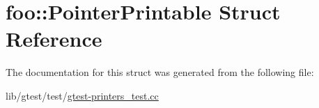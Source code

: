 \hypertarget{structfoo_1_1_pointer_printable}{\section{foo\-:\-:Pointer\-Printable Struct Reference}
\label{structfoo_1_1_pointer_printable}
}


The documentation for this struct was generated from the following file\-:\begin{DoxyCompactItemize}
\item 
lib/gtest/test/\hyperlink{gtest-printers__test_8cc}{gtest-\/printers\-\_\-test.\-cc}\end{DoxyCompactItemize}
